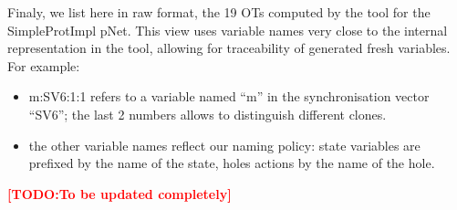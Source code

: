 \documentclass{lmcs}
\newcommand{\TODO}[1]{\textcolor{red}{\textbf{[TODO:#1]}}}
\begin{document}

Finaly, we list here in raw format, the 19 OTs computed by the tool for the SimpleProtImpl pNet.
This view uses variable names very close to the internal representation in the tool, allowing for traceability of generated fresh variables. For example:
\begin{itemize}
\item m:SV6:1:1 refers to a variable named ``m'' in the synchronisation vector ``SV6''; the last 2 numbers allows to distinguish different clones.
\item the other variable names reflect our naming policy: state variables are prefixed by the name of the state, holes actions by the name of the hole.
\end{itemize}

\TODO{To be updated completely}
\end{document}
